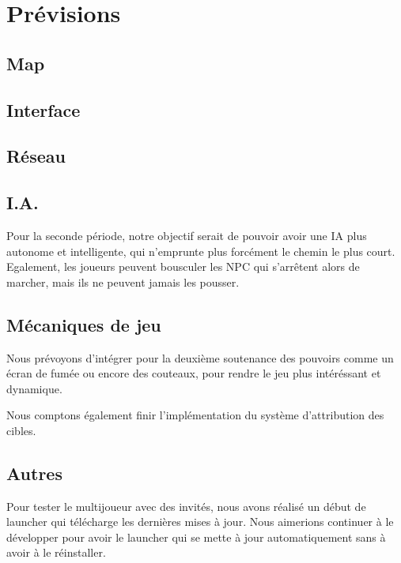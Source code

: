 \section{Prévisions}

\subsection{Map}

\subsection{Interface}

\subsection{Réseau}

\subsection{I.A.}
    Pour la seconde période, notre objectif serait de pouvoir avoir une IA plus autonome et intelligente, qui n'emprunte plus forcément le chemin le plus court.
    Egalement, les joueurs peuvent bousculer les NPC qui s'arrêtent alors de marcher, mais ils ne peuvent jamais les pousser.

\subsection{Mécaniques de jeu}
    Nous prévoyons d'intégrer pour la deuxième soutenance des pouvoirs
    comme un écran de fumée ou encore des couteaux,
    pour rendre le jeu plus intéréssant et dynamique.

    Nous comptons également finir l'implémentation du système
    d'attribution des cibles.

\subsection{Autres}
    Pour tester le multijoueur avec des invités, nous avons réalisé 
    un début de launcher qui télécharge les dernières mises à jour.
    Nous aimerions continuer à le développer pour avoir le launcher
    qui se mette à jour automatiquement sans à avoir à le réinstaller.
